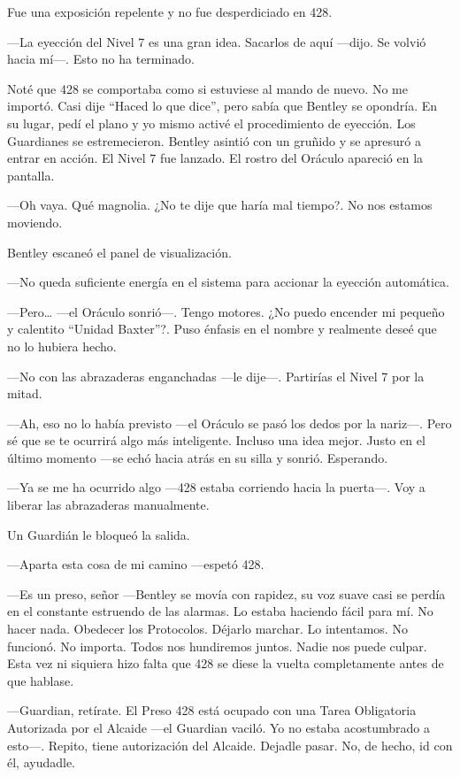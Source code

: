 Fue una exposición repelente y no fue desperdiciado en 428.

---La eyección del Nivel 7 es una gran idea. Sacarlos de aquí ---dijo.
Se volvió hacia mí---. Esto no ha terminado.

Noté que 428 se comportaba como si estuviese al mando de nuevo. No me
importó. Casi dije ``Haced lo que dice'', pero sabía que Bentley se
opondría. En su lugar, pedí el plano y yo mismo activé el procedimiento
de eyección. Los Guardianes se estremecieron. Bentley asintió con un
gruñido y se apresuró a entrar en acción. El Nivel 7 fue lanzado. El
rostro del Oráculo apareció en la pantalla.

---Oh vaya. Qué magnolia. ¿No te dije que haría mal tiempo?. No nos
estamos moviendo.

Bentley escaneó el panel de visualización.

---No queda suficiente energía en el sistema para accionar la eyección
automática.

---Pero\ldots{} ---el Oráculo sonrió---. Tengo motores. ¿No puedo
encender mi pequeño y calentito ``Unidad Baxter''?. Puso énfasis en el
nombre y realmente deseé que no lo hubiera hecho.

---No con las abrazaderas enganchadas ---le dije---. Partirías el Nivel
7 por la mitad.

---Ah, eso no lo había previsto ---el Oráculo se pasó los dedos por la
nariz---. Pero sé que se te ocurrirá algo más inteligente. Incluso una
idea mejor. Justo en el último momento ---se echó hacia atrás en su
silla y sonrió. Esperando.

---Ya se me ha ocurrido algo ---428 estaba corriendo hacia la puerta---.
Voy a liberar las abrazaderas manualmente.

Un Guardián le bloqueó la salida.

---Aparta esta cosa de mi camino ---espetó 428.

---Es un preso, señor ---Bentley se movía con rapidez, su voz suave casi
se perdía en el constante estruendo de las alarmas. Lo estaba haciendo
fácil para mí. No hacer nada. Obedecer los Protocolos. Déjarlo marchar.
Lo intentamos. No funcionó. No importa. Todos nos hundiremos juntos.
Nadie nos puede culpar. Esta vez ni siquiera hizo falta que 428 se diese
la vuelta completamente antes de que hablase.

---Guardian, retírate. El Preso 428 está ocupado con una Tarea
Obligatoria Autorizada por el Alcaide ---el Guardian vaciló. Yo no
estaba acostumbrado a esto---. Repito, tiene autorización del Alcaide.
Dejadle pasar. No, de hecho, id con él, ayudadle.

